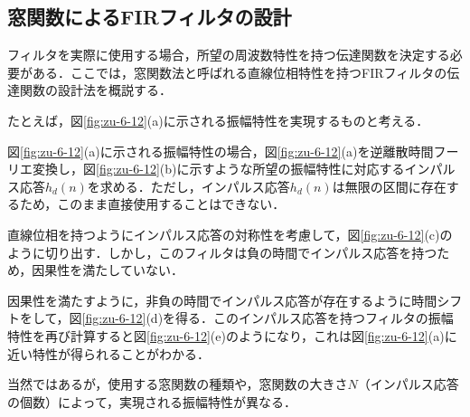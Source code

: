 \subsection{窓関数によるFIRフィルタの設計}

フィルタを実際に使用する場合，所望の周波数特性を持つ伝達関数を決定する必要がある．ここでは，窓関数法と呼ばれる直線位相特性を持つFIRフィルタの伝達関数の設計法を概説する．


たとえば，図\ref{fig:zu-6-12}(a)に示される振幅特性を実現するものと考える．



図\ref{fig:zu-6-12}(a)に示される振幅特性の場合，図\ref{fig:zu-6-12}(a)を逆離散時間フーリエ変換し，図\ref{fig:zu-6-12}(b)に示すような所望の振幅特性に対応するインパルス応答$h_d(n)$を求める．ただし，インパルス応答$h_d(n)$は無限の区間に存在するため，このまま直接使用することはできない．


直線位相を持つようにインパルス応答の対称性を考慮して，図\ref{fig:zu-6-12}(c)のように切り出す．しかし，このフィルタは負の時間でインパルス応答を持つため，因果性を満たしていない．


因果性を満たすように，非負の時間でインパルス応答が存在するように時間シフトをして，図\ref{fig:zu-6-12}(d)を得る．このインパルス応答を持つフィルタの振幅特性を再び計算すると図\ref{fig:zu-6-12}(e)のようになり，これは図\ref{fig:zu-6-12}(a)に近い特性が得られることがわかる．

当然ではあるが，使用する窓関数の種類や，窓関数の大きさ$N$（インパルス応答の個数）によって，実現される振幅特性が異なる．

